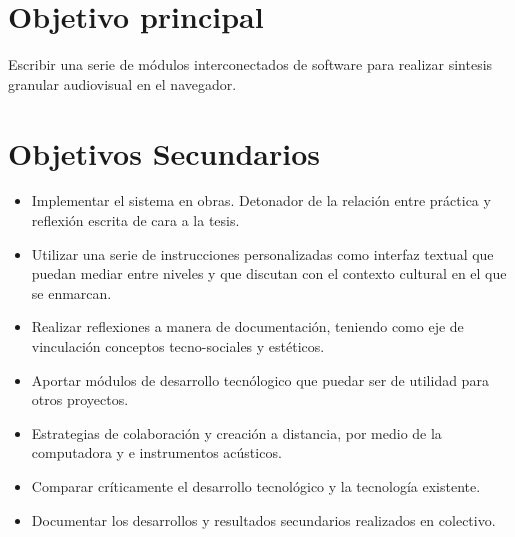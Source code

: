 \section*{Objetivo principal}

Escribir una serie de módulos interconectados de software para realizar sintesis granular audiovisual en el navegador.

\section*{Objetivos Secundarios}

\begin{itemize}

\item Implementar el sistema en obras. Detonador de la relación entre práctica y reflexión escrita de cara a la tesis.
\item Utilizar una serie de instrucciones personalizadas como interfaz textual que puedan mediar entre niveles y que discutan con el contexto cultural en el que se enmarcan.
\item Realizar reflexiones a manera de documentación, teniendo como eje de vinculación conceptos tecno-sociales y estéticos.
\item Aportar módulos de desarrollo tecnólogico que puedar ser de utilidad para otros proyectos.
\item Estrategias de colaboración y creación a distancia, por medio de la computadora y e instrumentos acústicos.
\item Comparar críticamente el desarrollo tecnológico y la tecnología existente.
\item Documentar los desarrollos y resultados secundarios realizados en colectivo.

\end{itemize}

